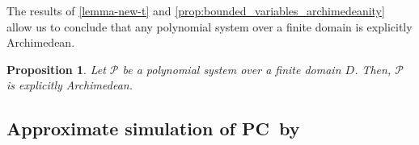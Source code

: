 \documentclass[11pt]{article}
\newcommand{\sos}{\text{\sc{SoS}}}
\newcommand{\F}{\mathcal{F}}
\newcommand{\PC}{\textsc{PC}}
\newcommand{\1}{\textbf{1}}
\newtheorem{definition}[theorem]{Definition}
\newtheorem{proposition}[theorem]{Proposition}
\begin{document}
The results of \cref{lemma-new-t} and \cref{prop:bounded_variables_archimedeanity} allow us to conclude that any polynomial system over a finite domain is explicitly Archimedean.
\begin{proposition}\label{prop:finite-archi}
    Let $\mathcal{P}$ be a polynomial system over a finite domain $D$. Then, $\mathcal{P}$ is explicitly Archimedean.
\end{proposition} 



\subsection{Approximate simulation of \PC\ by \sos}\label{sect:proof_sos_sim_PC}
\end{document}
